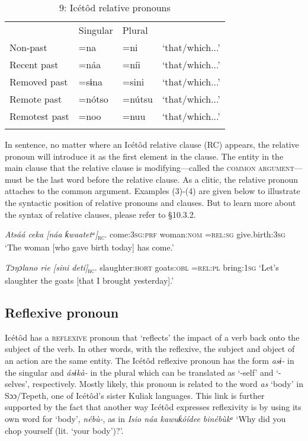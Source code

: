 \begin{table}
\caption{9: Icétôd relative pronouns}
\label{tab:5}


\begin{tabularx}{\textwidth}{XXXX} & Singular & Plural & \\
\lsptoprule
Non-past & =na & =ni & ‘that/which...’\\
Recent past & =náa & =níi & ‘that/which...’\\
Removed past & =sɨna & =sini & ‘that/which...’\\
Remote past & =nótso & =nútsu & ‘that/which...’\\
Remotest past & =noo & =nuu & ‘that/which...’\\
\lspbottomrule
\end{tabularx}
\end{table}
In sentence, no matter where an Icétôd relative clause (RC) appears, the relative pronoun will introduce it as the first element in the clause. The entity in the main clause that the relative clause is modifying—called the \textsc{common argument}—must be the last word before the relative clause. As a clitic, the relative pronoun attaches to the common argument. Examples (3)-(4) are given below to illustrate the syntactic position of relative pronouns and clauses. But to learn more about the syntax of relative clauses, please refer to §10.3.2.




\textit{Atsáá     ceka     [náa       ƙwaatetᵃ]}\textsc{\textsubscript{rc}}.
come:\textsc{3sg:prf}   woman:\textsc{nom} =\textsc{rel:sg} give.birth:\textsc{3sg}
‘The woman [who gave birth today] has come.’




\textit{Tɔŋɔlano     rie     [sini     detí]}\textsc{\textsubscript{rc}}.
slaughter:\textsc{hort}   goats:\textsc{obl      }=\textsc{rel:pl}   bring:\textsc{1sg}
‘Let’s slaughter the goats [that I brought yesterday].’






\subsection{Reflexive pronoun}


Icétôd has a \textsc{reflexive} pronoun that ‘reflects’ the impact of a verb back onto the subject of the verb. In other words, with the reflexive, the subject and object of an action are the same entity. The Icétôd reflexive pronoun has the form \textit{asɨ- }in the singular and \textit{ásɨkà- }in the plural which can be translated as ‘-self’ and ‘-selves’, respectively. Mostly likely, this pronoun is related to the word \textit{as }‘body’ in Sɔɔ/Tepeth, one of Icétôd’s sister Kuliak languages. This link is further supported by the fact that another way Icétôd expresses reflexivity is by using its own word for ‘body’, \textit{nébù-}, as in \textit{Isio náa kawuƙóídee binébùkᵃ} ‘Why did you chop yourself (lit. ‘your body’)?’.

